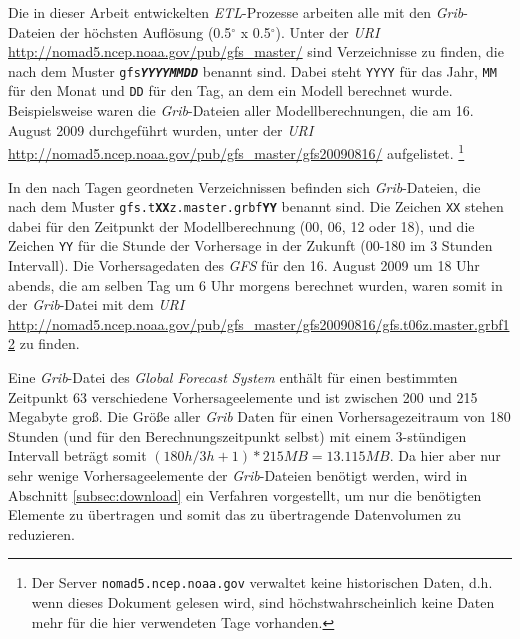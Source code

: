 Die in dieser Arbeit entwickelten \textit{ETL}-Prozesse arbeiten alle
mit den \textit{Grib}-Dateien der höchsten Auflösung (0.5$^{\circ}$ x
0.5$^{\circ}$). Unter der \textit{URI}
\url{http://nomad5.ncep.noaa.gov/pub/gfs_master/} sind Verzeichnisse
zu finden, die nach dem Muster \texttt{gfs\textbf{\textit{YYYYMMDD}}} benannt
sind. Dabei steht \texttt{YYYY} für das Jahr, \texttt{MM} für den
Monat und \texttt{DD} für den Tag, an dem ein Modell berechnet
wurde. Beispielsweise waren die \textit{Grib}-Dateien aller
Modellberechnungen, die am 16. August 2009 durchgeführt wurden, unter
der \textit{URI}
\url{http://nomad5.ncep.noaa.gov/pub/gfs_master/gfs20090816/}
aufgelistet.  \footnote{Der Server \texttt{nomad5.ncep.noaa.gov}
  verwaltet keine historischen Daten, d.h. wenn dieses Dokument
  gelesen wird, sind höchstwahrscheinlich keine Daten mehr für die
  hier verwendeten Tage vorhanden.}

In den nach Tagen geordneten Verzeichnissen befinden sich
\textit{Grib}-Dateien, die nach dem Muster
\texttt{gfs.t\textbf{XX}z.master.grbf\textbf{YY}} benannt sind. Die
Zeichen \texttt{XX} stehen dabei für den Zeitpunkt der
Modellberechnung (00, 06, 12 oder 18), und die Zeichen \texttt{YY} für
die Stunde der Vorhersage in der Zukunft (00-180 im 3 Stunden
Intervall). Die Vorhersagedaten des \textit{GFS} für den 16. August
2009 um 18 Uhr abends, die am selben Tag um 6 Uhr morgens berechnet
wurden, waren somit in der \textit{Grib}-Datei mit dem \textit{URI}
\url{http://nomad5.ncep.noaa.gov/pub/gfs_master/gfs20090816/gfs.t06z.master.grbf12}
zu finden.

Eine \textit{Grib}-Datei des \textit{Global Forecast System} enthält
für einen bestimmten Zeitpunkt 63 verschiedene Vorhersageelemente und
ist zwischen 200 und 215 Megabyte groß. Die Größe aller \textit{Grib}
Daten für einen Vorhersagezeitraum von 180 Stunden (und für den
Berechnungszeitpunkt selbst) mit einem 3-stündigen Intervall beträgt
somit $(180h / 3h + 1) * 215 MB = 13.115 MB$. Da hier aber nur sehr
wenige Vorhersageelemente der \textit{Grib}-Dateien benötigt werden,
wird in Abschnitt \ref{subsec:download} ein Verfahren vorgestellt, um
nur die benötigten Elemente zu übertragen und somit das zu
übertragende Datenvolumen zu reduzieren.

